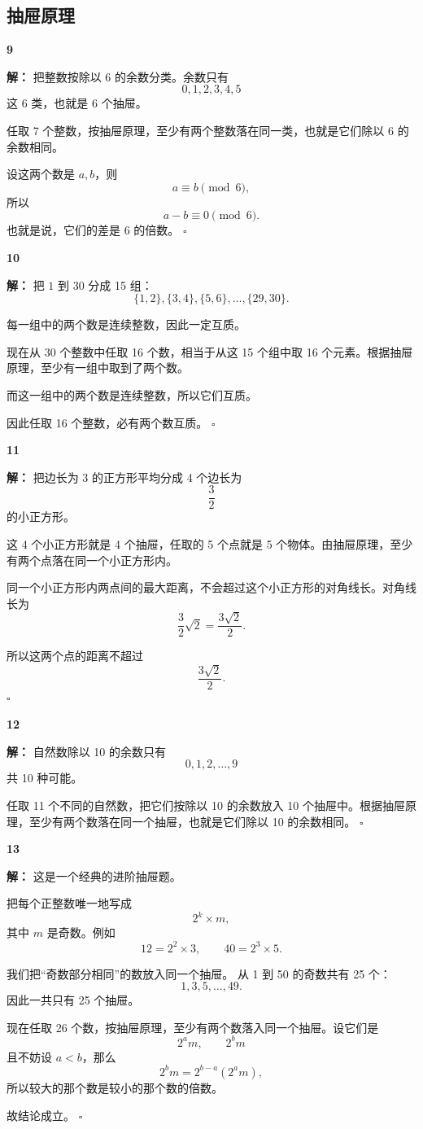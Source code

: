 \documentclass[11pt,a4paper,fontset=fandol]{ctexart}
\theoremstyle{formalexample}
\newenvironment{solution}{\par\noindent\textbf{解：}}{\hfill$\square$\par}
\begin{document}
\subsection*{抽屉原理}

\textbf{9}\begin{solution}
把整数按除以 6 的余数分类。余数只有
\[
0,1,2,3,4,5
\]
这 6 类，也就是 6 个抽屉。

任取 7 个整数，按抽屉原理，至少有两个整数落在同一类，也就是它们除以 6 的余数相同。

设这两个数是 $a,b$，则
\[
a\equiv b\pmod 6,
\]
所以
\[
a-b\equiv 0\pmod 6.
\]
也就是说，它们的差是 6 的倍数。
\end{solution}

\textbf{10}\begin{solution}
把 $1$ 到 $30$ 分成 15 组：
\[
\{1,2\},\{3,4\},\{5,6\},\ldots,\{29,30\}.
\]

每一组中的两个数是连续整数，因此一定互质。

现在从 30 个整数中任取 16 个数，相当于从这 15 个组中取 16 个元素。根据抽屉原理，至少有一组中取到了两个数。

而这一组中的两个数是连续整数，所以它们互质。

因此任取 16 个整数，必有两个数互质。
\end{solution}

\textbf{11}\begin{solution}
把边长为 3 的正方形平均分成 4 个边长为
\[
\frac32
\]
的小正方形。

这 4 个小正方形就是 4 个抽屉，任取的 5 个点就是 5 个物体。由抽屉原理，至少有两个点落在同一个小正方形内。

同一个小正方形内两点间的最大距离，不会超过这个小正方形的对角线长。对角线长为
\[
\frac32\sqrt{2}=\frac{3\sqrt{2}}{2}.
\]

所以这两个点的距离不超过
\[
\frac{3\sqrt{2}}{2}.
\]
\end{solution}

\textbf{12}\begin{solution}
自然数除以 10 的余数只有
\[
0,1,2,\ldots,9
\]
共 10 种可能。

任取 11 个不同的自然数，把它们按除以 10 的余数放入 10 个抽屉中。根据抽屉原理，至少有两个数落在同一个抽屉，也就是它们除以 10 的余数相同。
\end{solution}

\textbf{13}\begin{solution}
这是一个经典的进阶抽屉题。

把每个正整数唯一地写成
\[
2^k\times m,
\]
其中 $m$ 是奇数。例如
\[
12=2^2\times 3,\qquad 40=2^3\times 5.
\]

我们把“奇数部分相同”的数放入同一个抽屉。  
从 1 到 50 的奇数共有 25 个：
\[
1,3,5,\ldots,49.
\]
因此一共只有 25 个抽屉。

现在任取 26 个数，按抽屉原理，至少有两个数落入同一个抽屉。设它们是
\[
2^a m,\qquad 2^b m
\]
且不妨设 $a<b$，那么
\[
2^b m=2^{b-a}(2^a m),
\]
所以较大的那个数是较小的那个数的倍数。

故结论成立。
\end{solution}
\end{document}
